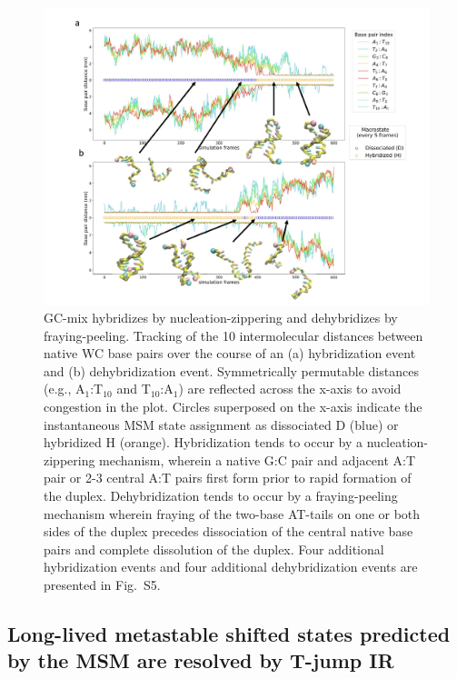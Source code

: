 \documentclass[journal=jpcbfk,manuscript=article]{achemso}
\newcommand*{\blauw}[1]{{#1}}
\begin{document}
\begin{figure}[ht!]
	\begin{center}
	\includegraphics[width=180mm, scale=1]{Fig4.pdf}
        \caption{GC-mix hybridizes by nucleation-zippering and dehybridizes by fraying-peeling. Tracking of the 10 intermolecular distances between native WC base pairs over the course of an (a) hybridization event and (b) dehybridization event. Symmetrically permutable distances (e.g., A$_1$:T$_{10}$ and T$_{10}$:A$_1$) are reflected across the x-axis to avoid congestion in the plot. Circles superposed on the x-axis indicate the instantaneous MSM state assignment as dissociated D (blue) or hybridized H (orange). Hybridization tends to occur by a nucleation-zippering mechanism, wherein a native G:C pair and adjacent A:T pair or 2-3 central A:T pairs first form prior to rapid formation of the duplex. Dehybridization tends to occur by a fraying-peeling mechanism wherein fraying of the two-base AT-tails on one or both sides of the duplex precedes dissociation of the central native base pairs and complete dissolution of the duplex. Four additional hybridization events and four additional dehybridization events are presented in \blauw{Fig.~S5}.
        }
        \label{fig:GC-mix_transitions}
	\end{center}
\end{figure}





\subsection{\label{sec:stretch_comparison}Long-lived metastable shifted states predicted by the MSM are resolved by T-jump IR}
\end{document}
